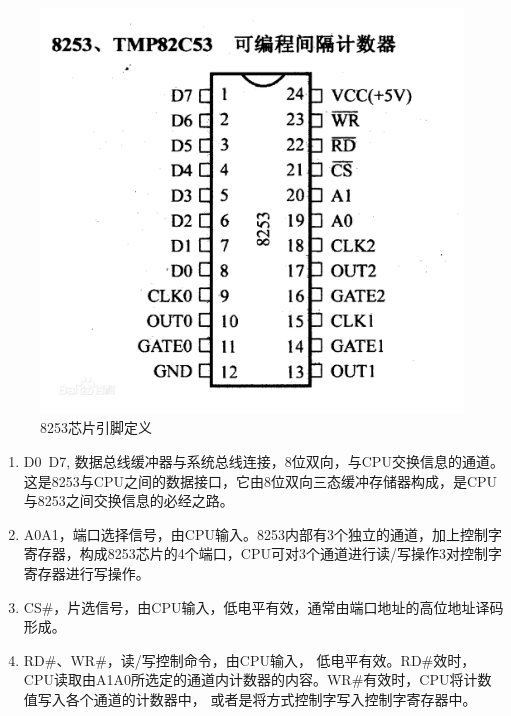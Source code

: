 \documentclass[12pt]{article}
\begin{document}
\begin{list}{•}{•}
\begin{figure}[htbp]
\centering
\includegraphics[scale=0.15]{fig/26.png}
\caption{8253芯片引脚定义}
\label{fig:Intel 8253 Chip outlook}
\end{figure}

\begin{enumerate}
\item D0~D7, 数据总线缓冲器与系统总线连接，8位双向，与CPU交换信息的通道。这是8253与CPU之间的数据接口，它由8位双向三态缓冲存储器构成，是CPU与8253之间交换信息的必经之路。
\item A0A1，端口选择信号，由CPU输入。8253内部有3个独立的通道，加上控制字寄存器，构成8253芯片的4个端口，CPU可对3个通道进行读/写操作3对控制字寄存器进行写操作。
\item CS\#，片选信号，由CPU输入，低电平有效，通常由端口地址的高位地址译码形成。
\item RD\#、WR\#，读/写控制命令，由CPU输入， 低电平有效。RD\#效时，CPU读取由A1A0所选定的通道内计数器的内容。WR\#有效时，CPU将计数值写入各个通道的计数器中， 或者是将方式控制字写入控制字寄存器中。
\end{enumerate}


\end{list}
\end{document}
